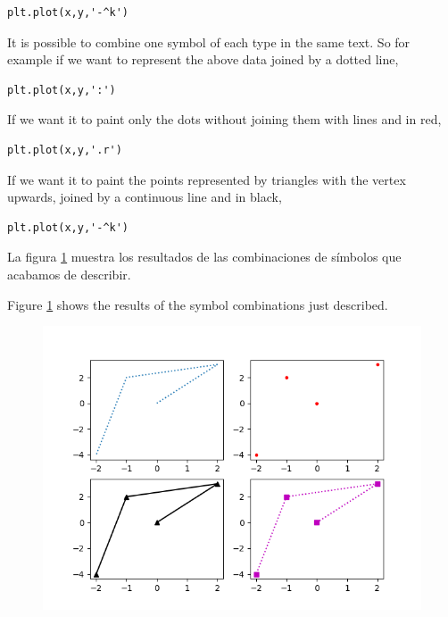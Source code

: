 \begin{paracol}{2}
\begin{verbatim}
plt.plot(x,y,'-^k')
\end{verbatim}

\switchcolumn
It is possible to combine one symbol of each type in the same text. So for example if we want to represent the above data joined by a dotted line,
\begin{verbatim}
plt.plot(x,y,':')    
\end{verbatim}

If we want it to paint only the dots without joining them with lines and in red,
\begin{verbatim}
plt.plot(x,y,'.r')
\end{verbatim}
If we want it to paint the points represented by triangles with the vertex upwards, joined by a continuous line and in black,

\begin{verbatim}
plt.plot(x,y,'-^k')
\end{verbatim}


\switchcolumn
La figura \ref{fig:tplot} muestra los resultados de las combinaciones de símbolos que acabamos de describir.

\switchcolumn
Figure \ref{fig:tplot} shows the results of the symbol combinations just described.
\end{paracol}

\begin{figure}
    \centering
    \includegraphics[width=1\linewidth]{figuras/tipos_plot.png}
    \label{fig:tplot}
\end{figure}

